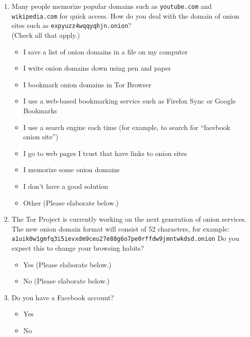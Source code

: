 \begin{enumerate}
    \item Many people memorize popular domains such as \texttt{youtube.com} and
        \texttt{wikipedia.com} for quick access. How do you deal with the domain
        of onion sites such as \texttt{expyuzz4wqqyqhjn.onion}?\\(Check all that
        apply.)
        \begin{itemize}[label=$\Square$]
            \item I save a list of onion domains in a file on my computer
            \item I write onion domains down using pen and paper
            \item I bookmark onion domains in Tor Browser
            \item I use a web-based bookmarking service such as Firefox Sync or
                Google Bookmarks
            \item I use a search engine each time (for example, to search for
                ``facebook onion site'')
            \item I go to web pages I trust that have links to onion sites
            \item I memorize some onion domains
            \item I don't have a good solution
            \item Other (Please elaborate below.)
        \end{itemize}

    \item The Tor Project is currently working on the next generation of onion
        services. The new onion domain format will consist of 52 characters,
        for example:
        \texttt{a1uik0w1gmfq3i5ievxdm9ceu27e88g6o7pe0rffdw9jmn\-twkdsd.onion}
        Do you expect this to change your browsing habits?
        \begin{itemize}[label=$\Circle$]
            \item Yes (Please elaborate below.)
            \item No (Please elaborate below.)
        \end{itemize}

    \item Do you have a Facebook account?
        \begin{itemize}[label=$\Circle$]
            \item Yes
            \item No
        \end{itemize}


\end{enumerate}
